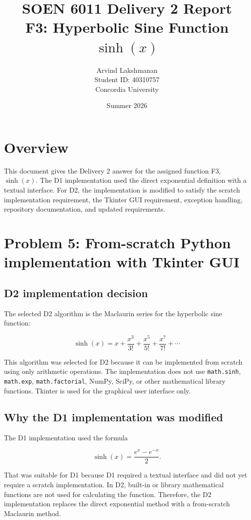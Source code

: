 \documentclass[11pt]{article}
\title{SOEN 6011 Delivery 2 Report\\F3: Hyperbolic Sine Function $\sinh(x)$}
\author{Arvind Lakshmanan\\Student ID: 40310757\\Concordia University}
\date{Summer 2026}
\begin{document}
\maketitle

\section*{Overview}

This document gives the Delivery 2 answer for the assigned function F3, $\sinh(x)$. The D1 implementation used the direct exponential definition with a textual interface. For D2, the implementation is modified to satisfy the scratch implementation requirement, the Tkinter GUI requirement, exception handling, repository documentation, and updated requirements.

\section{Problem 5: From-scratch Python implementation with Tkinter GUI}

\subsection{D2 implementation decision}

The selected D2 algorithm is the Maclaurin series for the hyperbolic sine function:

\[
\sinh(x)=x+\frac{x^3}{3!}+\frac{x^5}{5!}+\frac{x^7}{7!}+\cdots
\]

This algorithm was selected for D2 because it can be implemented from scratch using only arithmetic operations. The implementation does not use \texttt{math.sinh}, \texttt{math.exp}, \texttt{math.factorial}, NumPy, SciPy, or other mathematical library functions. Tkinter is used for the graphical user interface only.

\subsection{Why the D1 implementation was modified}

The D1 implementation used the formula

\[
\sinh(x)=\frac{e^x-e^{-x}}{2}.
\]

That was suitable for D1 because D1 required a textual interface and did not yet require a scratch implementation. In D2, built-in or library mathematical functions are not used for calculating the function. Therefore, the D2 implementation replaces the direct exponential method with a from-scratch Maclaurin method.
\end{document}
